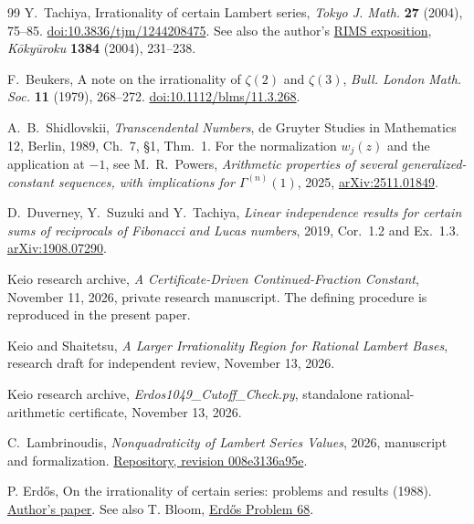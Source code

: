 \documentclass[11pt,a4paper]{article}
\theoremstyle{definition}
\theoremstyle{remark}
\begin{document}
\begin{thebibliography}{99}
 Y.~Tachiya, Irrationality of certain Lambert series,
\emph{Tokyo J. Math.} \textbf{27} (2004), 75--85.
\href{https://doi.org/10.3836/tjm/1244208475}{doi:10.3836/tjm/1244208475}.
See also the author's
\href{https://www.kurims.kyoto-u.ac.jp/~kyodo/kokyuroku/contents/pdf/1384-34.pdf}{RIMS exposition},
\emph{K\=oky\=uroku} \textbf{1384} (2004), 231--238.

 F.~Beukers, A note on the irrationality of $\zeta(2)$
and $\zeta(3)$, \emph{Bull. London Math. Soc.} \textbf{11} (1979),
268--272. \href{https://doi.org/10.1112/blms/11.3.268}{doi:10.1112/blms/11.3.268}.

 A.~B.~Shidlovskii, \emph{Transcendental Numbers},
de Gruyter Studies in Mathematics 12, Berlin, 1989, Ch.~7, \S1,
Thm.~1. For the normalization $w_j(z)$ and the application at $-1$, see
M.~R.~Powers, \emph{Arithmetic properties of several generalized-constant
sequences, with implications for $\Gamma^{(n)}(1)$}, 2025,
\href{https://arxiv.org/abs/2511.01849}{arXiv:2511.01849}.

 D.~Duverney, Y.~Suzuki and Y.~Tachiya, \emph{Linear
independence results for certain sums of reciprocals of Fibonacci and
Lucas numbers}, 2019, Cor.~1.2 and Ex.~1.3.
\href{https://arxiv.org/abs/1908.07290}{arXiv:1908.07290}.

 Keio research archive, \emph{A Certificate-Driven
Continued-Fraction Constant}, November 11, 2026, private research
manuscript. The defining procedure is reproduced in the present paper.

 Keio and Shaitetsu, \emph{A Larger Irrationality
Region for Rational Lambert Bases}, research draft for independent
review, November 13, 2026.

 Keio research archive,
\emph{Erdos1049\_Cutoff\_Check.py}, standalone rational-arithmetic
certificate, November 13, 2026.

 C.~Lambrinoudis, \emph{Nonquadraticity of Lambert
Series Values}, 2026, manuscript and formalization.
\href{https://github.com/clambro/lambert-nonquadraticity/tree/008e3136a95e1e1ea605837ca9742b8613b2034a}{Repository, revision 008e3136a95e}.

 P. Erd\H{o}s, On the irrationality of certain series: problems and results (1988). \href{https://renyi.hu/~p_erdos/1988-22.pdf}{Author's paper}. See also T. Bloom, \href{https://www.erdosproblems.com/68}{Erd\H{o}s Problem 68}.
\end{thebibliography}
\end{document}
